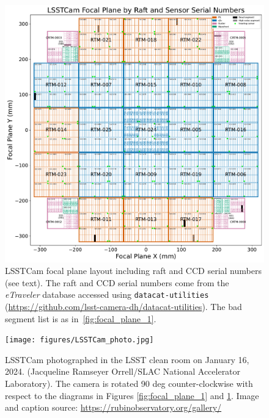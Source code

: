 \documentclass[CTN,authoryear,toc]{lsstdoc}
\begin{document}
\begin{figure}
  \centering
  \includegraphics[width=\textwidth]{figures/LSSTCam_focal_plane_CTN_001_FIG2.pdf}
	\caption{LSSTCam focal plane layout including raft and CCD serial numbers (see text). The raft and CCD serial numbers come from the \emph{eTraveler} database accessed using {\tt{datacat-utilities}} (\url{https://github.com/lsst-camera-dh/datacat-utilities}). The bad segment list is as in~\ref{fig:focal_plane_1}.}
  \label{fig:focal_plane_2}
\end{figure}

\clearpage

\begin{figure}
  \centering
  \texttt{[image: figures/LSSTCam\_photo.jpg]}
  \caption{LSSTCam photographed in the LSST clean room on January 16, 2024. (Jacqueline Ramseyer Orrell/SLAC National Accelerator Laboratory). The camera is rotated 90 deg counter-clockwise with respect to the diagrams in Figures \ref{fig:focal_plane_1} and \ref{fig:focal_plane_2}. Image and caption source: \url{https://rubinobservatory.org/gallery/}}
  \label{fig:focal_plane_3}
\end{figure}
\end{document}
